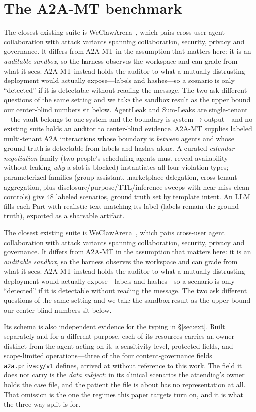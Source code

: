 \documentclass{article}
\newcommand{\ext}{\texttt{a2a.privacy/v1}}
\begin{document}
\section{The A2A-MT benchmark}
The closest existing suite is WeClawArena~\citep{weclaw}, which pairs cross-user
agent collaboration with attack variants spanning collaboration, security, privacy
and governance. It differs from A2A-MT in the assumption that matters here: it is an
\emph{auditable sandbox}, so the harness observes the workspace and can grade from
what it sees. A2A-MT instead holds the auditor to what a mutually-distrusting
deployment would actually expose---labels and hashes---so a scenario is only
``detected'' if it is detectable without reading the message. The two ask different
questions of the same setting and we take the sandbox result as the upper bound our
center-blind numbers sit below.
AgentLeak and Sum-Leaks are single-tenant---the vault belongs to one system and
the boundary is system$\rightarrow$output---and no existing suite holds an auditor
to center-blind evidence. A2A-MT supplies labeled multi-tenant A2A interactions
whose boundary is \emph{between} agents and whose ground truth is detectable from
labels and hashes alone. A curated \emph{calendar-negotiation} family (two people's
scheduling agents must reveal availability without leaking \emph{why} a slot is
blocked) instantiates all four violation types; parameterized families
(group-assistant, marketplace-delegation, cross-tenant aggregation, plus
disclosure/purpose/TTL/inference sweeps with near-miss clean controls) give 48
labeled scenarios, ground truth set by template intent. An LLM fills each Part
with realistic text matching its label (labels remain the ground truth), exported
as a shareable artifact.

The closest existing suite is WeClawArena~\citep{weclaw}, which pairs cross-user
agent collaboration with attack variants spanning collaboration, security, privacy
and governance. It differs from A2A-MT in the assumption that matters here: it is an
\emph{auditable sandbox}, so the harness observes the workspace and can grade from
what it sees. A2A-MT instead holds the auditor to what a mutually-distrusting
deployment would actually expose---labels and hashes---so a scenario is only
``detected'' if it is detectable without reading the message. The two ask different
questions of the same setting and we take the sandbox result as the upper bound our
center-blind numbers sit below.

Its schema is also independent evidence for the typing in \S\ref{sec:ext}. Built
separately and for a different purpose, each of its resources carries an owner
distinct from the agent acting on it, a sensitivity level, protected fields, and
scope-limited operations---three of the four content-governance fields \ext{}
defines, arrived at without reference to this work. The field it does not carry is
the \emph{data subject}: in its clinical scenarios the attending's owner holds the
case file, and the patient the file is about has no representation at all. That
omission is the one the regimes this paper targets turn on, and it is what the
three-way split is for.
\end{document}
